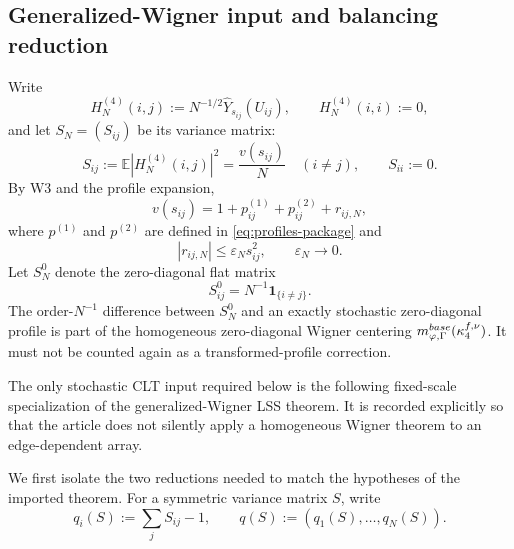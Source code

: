 \documentclass[10pt,a4paper]{amsart}
\newcommand{\E}{\mathbb E}
\newcommand{\one}{\mathbf 1}
\begin{document}
\subsection{Generalized-Wigner input and balancing reduction}

Write
\begin{equation}\label{eq:R3-centered-array}
 H_N^{(4)}(i,j):=N^{-1/2}\widehat Y_{s_{ij}}(U_{ij}),
 \qquad H_N^{(4)}(i,i):=0,
\end{equation}
and let \(S_N=(S_{ij})\) be its variance matrix:
\begin{equation}\label{eq:R3-variance-matrix}
 S_{ij}:=\E|H_N^{(4)}(i,j)|^2
 =\frac{v(s_{ij})}{N}\quad(i\ne j),
 \qquad S_{ii}:=0.
\end{equation}
By W3 and the profile expansion,
\begin{equation}\label{eq:R3-p-decomposition}
 v(s_{ij})=1+p_{ij}^{(1)}+p_{ij}^{(2)}+r_{ij,N},
\end{equation}
where \(p^{(1)}\) and \(p^{(2)}\) are defined in
\eqref{eq:profiles-package} and
\begin{equation}\label{eq:R3-rem-bound}
 |r_{ij,N}|\le\varepsilon_Ns_{ij}^2,\qquad \varepsilon_N\to0.
\end{equation}
Let \(S_N^0\) denote the zero-diagonal flat matrix
\begin{equation}\label{eq:R3-flat-S}
 S_{ij}^0=N^{-1}\one_{\{i\ne j\}}.
\end{equation}
The order-\(N^{-1}\) difference between \(S_N^0\) and an exactly stochastic
zero-diagonal profile is part of the homogeneous zero-diagonal Wigner
centering \(m_{\varphi,\Gamma}^{\rm base}(\kappa_4^{f,\nu})\).  It must not be counted again as
a transformed-profile correction.

The only stochastic CLT input required below is the following
fixed-scale specialization of the generalized-Wigner LSS theorem.  It is
recorded explicitly so that the article does not silently apply a homogeneous
Wigner theorem to an edge-dependent array.

We first isolate the two reductions needed to match the hypotheses of the
imported theorem.  For a symmetric variance matrix \(S\), write
\[
 q_i(S):=\sum_jS_{ij}-1,
 \qquad
 q(S):=(q_1(S),\ldots,q_N(S)).
\]
\end{document}
